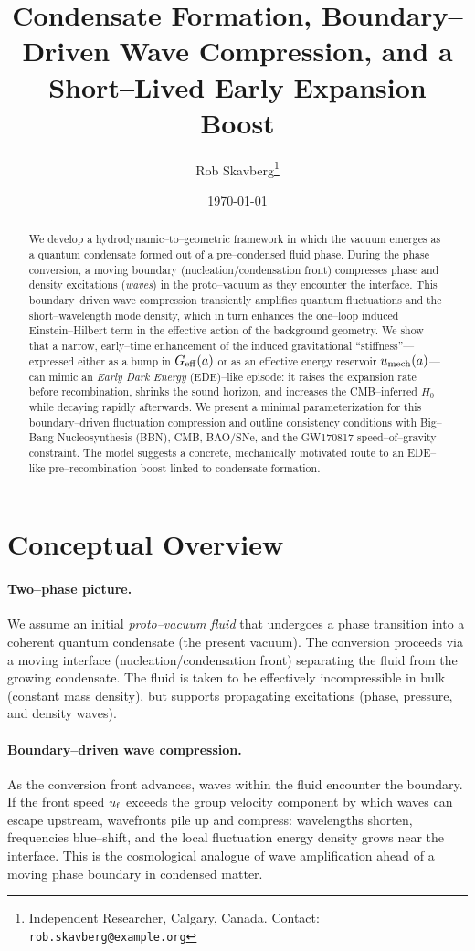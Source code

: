 \documentclass[11pt,a4paper]{article}
\title{\textbf{Condensate Formation, Boundary--Driven Wave Compression, and a Short--Lived Early Expansion Boost}}
\author{Rob Skavberg\thanks{Independent Researcher, Calgary, Canada. Contact: \texttt{rob.skavberg@example.org}}}
\date{\today}
\newcommand{\Geff}{G_{\rm eff}}
\begin{document}
\maketitle
\doublespacing

\begin{abstract}
We develop a hydrodynamic--to--geometric framework in which the vacuum emerges as a quantum condensate formed out of a pre--condensed fluid phase. During the phase conversion, a moving boundary (nucleation/condensation front) compresses phase and density excitations (\emph{waves}) in the proto--vacuum as they encounter the interface. This boundary--driven wave compression transiently amplifies quantum fluctuations and the short--wavelength mode density, which in turn enhances the one--loop induced Einstein--Hilbert term in the effective action of the background geometry. We show that a narrow, early--time enhancement of the induced gravitational ``stiffness''---expressed either as a bump in $\Geff(a)$ or as an effective energy reservoir $u_{\rm mech}(a)$---can mimic an \emph{Early Dark Energy} (EDE)--like episode: it raises the expansion rate before recombination, shrinks the sound horizon, and increases the CMB--inferred $H_0$ while decaying rapidly afterwards. We present a minimal parameterization for this boundary--driven fluctuation compression and outline consistency conditions with Big--Bang Nucleosynthesis (BBN), CMB, BAO/SNe, and the GW170817 speed--of--gravity constraint. The model suggests a concrete, mechanically motivated route to an EDE--like pre--recombination boost linked to condensate formation.
\end{abstract}

\section{Conceptual Overview}
\paragraph{Two--phase picture.}
We assume an initial \emph{proto--vacuum fluid} that undergoes a phase transition into a coherent quantum condensate (the present vacuum). The conversion proceeds via a moving interface (nucleation/condensation front) separating the fluid from the growing condensate. The fluid is taken to be effectively incompressible in bulk (constant mass density), but supports propagating excitations (phase, pressure, and density waves).

\paragraph{Boundary--driven wave compression.}
As the conversion front advances, waves within the fluid encounter the boundary. If the front speed $u_{\rm f}$ exceeds the group velocity component by which waves can escape upstream, wavefronts pile up and compress: wavelengths shorten, frequencies blue--shift, and the local fluctuation energy density grows near the interface. This is the cosmological analogue of wave amplification ahead of a moving phase boundary in condensed matter.
\end{document}
